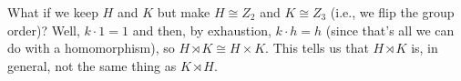 \begin{example}
What if we keep $H$ and $K$ but make $H \cong Z_2$ and $K \cong Z_3$ (i.e., we flip the group order)? Well, $k \cdot 1 = 1$ and then, by exhaustion, $k \cdot h = h$ (since that's all we can do with a homomorphism), so $H \rtimes K \cong H \times K$. This tells us that $H \rtimes K$ is, in general, not the same thing as $K \rtimes H$.
\end{example}